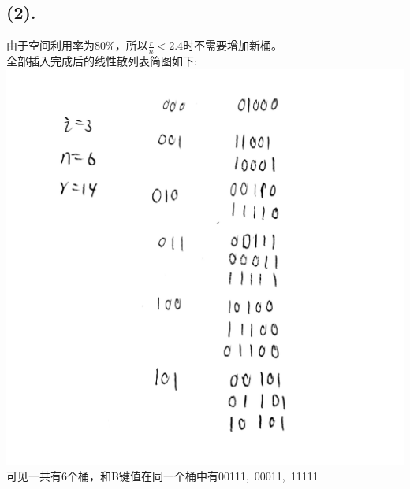 \documentclass{article}
\begin{document}
	\subsection*{(2).}
	由于空间利用率为$80\%$，所以$\frac{r}{n}<2.4$时不需要增加新桶。\\
	全部插入完成后的线性散列表简图如下: \\
	\includegraphics[scale=0.15]{9.jpg}\\
	可见一共有6个桶，和B键值在同一个桶中有00111,\ 00011,\ 11111
\end{document}
